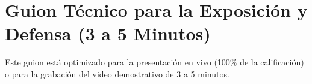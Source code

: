 \documentclass[11pt,a4paper]{article}
\begin{document}
\newpage
\section{Guion Técnico para la Exposición y Defensa (3 a 5 Minutos)}

\begin{tcolorbox}[colback=alertbg,colframe=alertborder,arc=2mm,title=\textbf{\color{brown}INSTRUCCIONES PARA LA DEFENSA}]
Este guion está optimizado para la presentación en vivo (100\% de la calificación) o para la grabación del video demostrativo de 3 a 5 minutos.
\end{tcolorbox}
\end{document}
